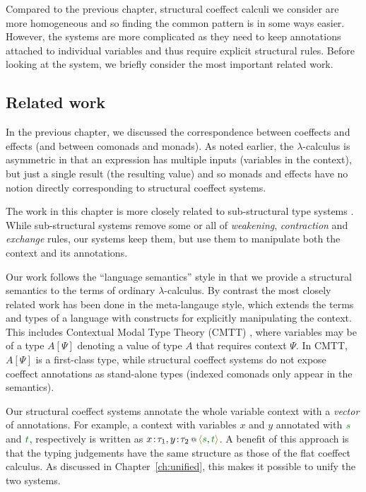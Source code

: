 Compared to the previous chapter, structural coeffect calculi we consider are more 
homogeneous and so finding the common pattern is in some ways easier. However, the systems
are more complicated as they need to keep annotations attached to individual variables
and thus require explicit structural rules. Before looking at the system, we briefly consider
the most important related work. 


\subsection{Related work}

In the previous chapter, we discussed the correspondence between coeffects and effects (and 
between comonads and monads). As noted earlier, the $\lambda$-calculus is asymmetric in that
an expression has multiple inputs (variables in the context), but just a single result 
(the resulting value) and so monads and effects have no notion directly corresponding to 
structural coeffect systems.

The work in this chapter is more closely related to sub-structural type systems \cite{substruct-attpl-intro}.
While sub-structural systems remove some or all of \emph{weakening}, \emph{contraction} and
\emph{exchange} rules, our systems keep them, but use them to manipulate both the context
and its annotations.

Our work follows the ``language semantics'' style in that we provide a structural semantics to
the terms of ordinary $\lambda$-calculus. By contrast the most closely related work has been done in 
the meta-langauge style, which extends the terms and types of a language with constructs for explicitly
manipulating the context. This includes Contextual Modal Type Theory (CMTT) \cite{logic-cmtt}, where variables
may be of a type $A[\Psi]$ denoting a value of type $A$ that requires context $\Psi$. In CMTT, 
$A[\Psi]$ is a first-class type, while structural coeffect systems do not expose coeffect 
annotations as stand-alone types (indexed comonads only appear in the semantics).

Our structural coeffect systems annotate the whole variable context with a \emph{vector} of annotations.
For example, a context with variables $x$ and $y$ annotated with $\cclrd{s}$ and $\cclrd{t}$, 
respectively is written as $\coctx{x\!:\!\tau_1,y\!:\!\tau_2}{\alift{\cclrd{s},\cclrd{t}}}$.
A benefit of this approach is that the typing judgements have the same structure as those of the 
flat coeffect calculus. As discussed in Chapter~\ref{ch:unified}, this makes it possible to unify 
the two systems.



